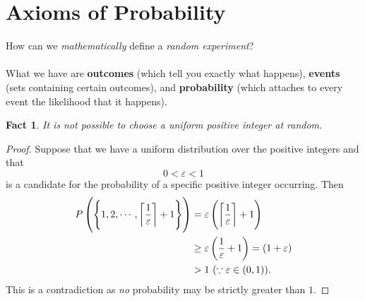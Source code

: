 \documentclass[12pt,a4paper]{article}
\DeclarePairedDelimiter\ceil{\lceil}{\rceil}
\newtheorem{fact}[theorem]{Fact}
\theoremstyle{definition}
\theoremstyle{definition}
\theoremstyle{definition}
\theoremstyle{definition}
\theoremstyle{remark}
\theoremstyle{definition}
\begin{document}
\newpage
\section{Axioms of Probability}
How can we \textit{mathematically} define a \textit{random experiment}?\\
\\
What we have are \textbf{outcomes} (which tell you exactly what happens), \textbf{events} (sets containing certain outcomes), and \textbf{probability} (which attaches to every event the likelihood that it happens).
\\
\begin{tcolorbox}[colback=white]
	\begin{fact}
		It is not possible to choose a uniform positive integer at random.
	\end{fact}\tcblower\begin{proof}
	Suppose that we have a uniform distribution over the positive integers and that \[0<\varepsilon<1\] is a candidate for the probability of a specific positive integer occurring. Then \begin{align*}
	P\left(\set{1,2,\cdots,\ceil*{\frac{1}{\varepsilon}}+1}\right) &=\varepsilon\left(\ceil*{\frac{1}{\varepsilon}}+1\right)\\
	&\geq\varepsilon\left(\frac{1}{\varepsilon}+1\right)=(1+\varepsilon)\\
	&>1\ (\because\varepsilon\in(0,1)).
	\end{align*} This is a contradiction as \textit{no} probability may be strictly greater than $1$.
\end{proof}
\end{tcolorbox}
\end{document}
